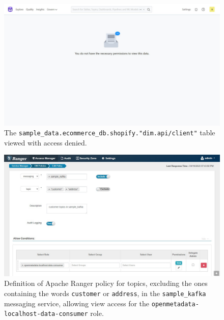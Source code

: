 \begin{figure}
    \centering
    \includegraphics[width=\textwidth]{chapters/appendix/figures/exp/2/alice_table.pdf}
    \caption{The \texttt{sample_data.ecommerce_db.shopify."dim.api/client"} table viewed with access denied.}
    \label{fig:exp_2_alice_table}
\end{figure}


\begin{figure}
    \centering
    \includegraphics[width=\textwidth]{chapters/appendix/figures/exp/3/kafka_ranger.pdf}
    \caption{Definition of Apache Ranger policy for topics, excluding the ones containing the words \texttt{customer} or \texttt{address}, in the \texttt{sample_kafka} messaging service, allowing view access for the \texttt{openmetadata-localhost-data-consumer} role.}
    \label{fig:exp_3_ranger}
\end{figure}

